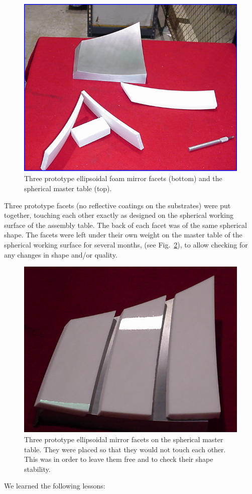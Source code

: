 \begin{figure}[ht]
    \centering
    \includegraphics[width=1.0\linewidth]{images/Proto_4parts.png}
    \caption{Three prototype ellipsoidal foam mirror facets (bottom) and the spherical master table (top).}
    \label{fig:Proto_4parts}
\end{figure}

Three prototype facets (no reflective coatings on the substrates) were put together, touching each other exactly
as designed on the spherical working surface of the assembly table. The back of each facet was of the same
spherical shape. The facets were left under their own weight on the master table of the spherical working surface
for several months, (see Fig.~\ref{fig:Prototype}), to allow checking for any changes in shape and/or quality.

\begin{figure}[ht]
    \centering
    \includegraphics[width=1.0\linewidth]{images/Prototype.png}
    \caption{Three prototype ellipsoidal mirror facets on the spherical master table. They were placed so that they
      would not touch each other. This was in order to leave them free and to check their shape stability.}
    \label{fig:Prototype}
\end{figure}
We learned the following lessons:

